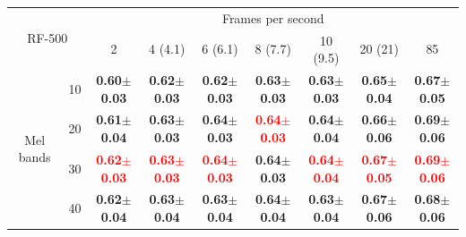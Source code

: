 \documentclass[final,3p,times,twocolumn]{elsarticle}
\begin{document}
\begin{table}[h]
\begin{tabular}{ll|c|c|c|c|c|c|c|}
\cline{3-9}
\multicolumn{2}{c}{\multirow{2}{*}{RF-500}} & \multicolumn{7}{|c|}{Frames per second}\\ \cline{3-9}
 & & 2 & 4 (4.1) & 6 (6.1) & 8 (7.7) & 10 (9.5) & 20 (21) & 85 \\ \cline{1-9}
\multicolumn{1}{|c}{\multirow{4}{*}{Mel bands}}
 & \multicolumn{1}{|c|}{10} & \textbf{0.60$\pm$0.03} & \textbf{0.62$\pm$0.03} & \textbf{0.62$\pm$0.03} & \textbf{0.63$\pm$0.03} & \textbf{0.63$\pm$0.03} & \textbf{0.65$\pm$0.04} & \textbf{0.67$\pm$0.05} \\ \cline{2-9}
\multicolumn{1}{|c}{}
 & \multicolumn{1}{|c|}{20} & \textbf{0.61$\pm$0.04} & \textbf{0.63$\pm$0.03} & \textbf{0.64$\pm$0.03} & \textbf{\textcolor{red}{0.64$\pm$0.03}} & \textbf{0.64$\pm$0.04} & \textbf{0.66$\pm$0.06} & \textbf{0.69$\pm$0.06} \\ \cline{2-9}
\multicolumn{1}{|c}{}
 & \multicolumn{1}{|c|}{30} & \textbf{\textcolor{red}{0.62$\pm$0.03}} & \textbf{\textcolor{red}{0.63$\pm$0.03}} & \textbf{\textcolor{red}{0.64$\pm$0.03}} & \textbf{0.64$\pm$0.03} & \textbf{\textcolor{red}{0.64$\pm$0.04}} & \textbf{\textcolor{red}{0.67$\pm$0.05}} & \textbf{\textcolor{red}{0.69$\pm$0.06}} \\ \cline{2-9}
\multicolumn{1}{|c}{}
 & \multicolumn{1}{|c|}{40} & \textbf{0.62$\pm$0.04} & \textbf{0.63$\pm$0.04} & \textbf{0.63$\pm$0.04} & \textbf{0.64$\pm$0.04} & \textbf{0.63$\pm$0.04} & \textbf{0.67$\pm$0.06} & \textbf{0.68$\pm$0.06} \\ \cline{1-9}
\end{tabular}


\end{table}
\end{document}

